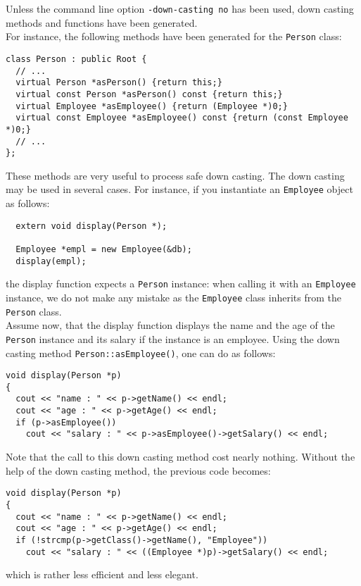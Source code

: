 Unless the command line option \texttt{-down-casting no} has been used,
down casting methods and functions have been generated.
\\
For instance, the following methods have been generated for the \texttt{Person} class:
\verbsize
\begin{verbatim}
class Person : public Root {
  // ...
  virtual Person *asPerson() {return this;}
  virtual const Person *asPerson() const {return this;}
  virtual Employee *asEmployee() {return (Employee *)0;}
  virtual const Employee *asEmployee() const {return (const Employee *)0;}
  // ...
};
\end{verbatim}
\normalsize
These methods are very useful to process safe down casting.
The down casting may be used in several cases.
For instance, if you instantiate an \texttt{Employee} object as follows:
\verbsize
\begin{verbatim}
  extern void display(Person *);

  Employee *empl = new Employee(&db);
  display(empl);
\end{verbatim}
\normalsize
the display function expects a \texttt{Person} instance: when calling
it with an \texttt{Employee} instance, we do not make any mistake as
the \texttt{Employee} class inherits from the \texttt{Person} class.
\\
Assume now, that the display function displays the name and the age
of the \texttt{Person} instance and its salary if the instance is an
employee. Using the down casting method \texttt{Person::asEmployee()},
one can do as follows:
\verbsize
\begin{verbatim}
void display(Person *p)
{
  cout << "name : " << p->getName() << endl;
  cout << "age : " << p->getAge() << endl;
  if (p->asEmployee())
    cout << "salary : " << p->asEmployee()->getSalary() << endl;
\end{verbatim}
\normalsize
Note that the call to this down casting method cost nearly nothing.
Without the help of the down casting method, the previous code becomes:
\verbsize
\begin{verbatim}
void display(Person *p)
{
  cout << "name : " << p->getName() << endl;
  cout << "age : " << p->getAge() << endl;
  if (!strcmp(p->getClass()->getName(), "Employee"))
    cout << "salary : " << ((Employee *)p)->getSalary() << endl;
\end{verbatim}
\normalsize
which is rather less efficient and less elegant.
\\
\\
